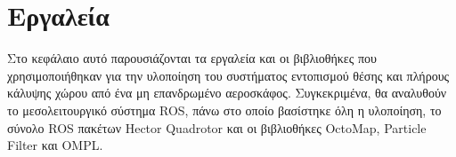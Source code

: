 \chapter{Εργαλεία}
\label{chapter:tools}

Στο κεφάλαιο αυτό παρουσιάζονται τα εργαλεία και οι βιβλιοθήκες που χρησιμοποιήθηκαν για την υλοποίηση του συστήματος εντοπισμού θέσης και πλήρους κάλυψης χώρου από ένα μη επανδρωμένο αεροσκάφος. Συγκεκριμένα, θα αναλυθούν το μεσολειτουργικό σύστημα ROS, πάνω στο οποίο βασίστηκε όλη η υλοποίηση, το σύνολο ROS πακέτων Hector Quadrotor και οι βιβλιοθήκες OctoMap, Particle Filter και OMPL.






